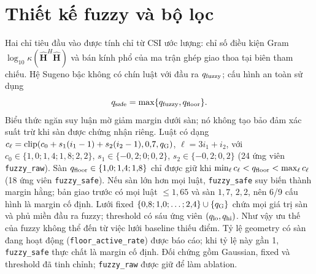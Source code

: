 \documentclass[conference,onecolumn,10pt]{IEEEtran}
\begin{document}
\section{Thiết kế fuzzy và bộ lọc}
Hai chỉ tiêu đầu vào được tính chỉ từ CSI ước lượng: chỉ số điều kiện Gram $\log_{10}\kappa(\widehat{\mathbf H}^H\widehat{\mathbf H})$ và bán kính phổ của ma trận ghép giao thoa tại biên tham chiếu. Hệ Sugeno bậc không có chín luật với đầu ra $q_{\rm fuzzy}$; cấu hình an toàn sử dụng
\begin{equation}
q_{\rm safe}=\max\{q_{\rm fuzzy},q_{\rm floor}\}.
\end{equation}
Biểu thức ngăn suy luận mờ giảm margin dưới sàn; nó không tạo bảo đảm xác suất trừ khi sàn được chứng nhận riêng. Luật có dạng $c_\ell=\mathrm{clip}(c_0+s_1(i_1-1)+s_2(i_2-1),0{,}7,q_{\rm G})$, $\ell=3i_1+i_2$, với $c_0\in\{1{,}0;1{,}4;1{,}8;2{,}2\}$, $s_1\in\{-0{,}2;0;0{,}2\}$, $s_2\in\{-0{,}2;0{,}2\}$ (24 ứng viên \texttt{fuzzy\_raw}). Sàn $q_{\rm floor}\in\{1{,}0;1{,}4;1{,}8\}$ chỉ được giữ khi $\min_\ell c_\ell<q_{\rm floor}<\max_\ell c_\ell$ (18 ứng viên \texttt{fuzzy\_safe}). Nếu sàn lớn hơn mọi luật, \texttt{fuzzy\_safe} suy biến thành margin hằng; bản giao trước có mọi luật $\leq1{,}65$ và sàn $1{,}7$, $2{,}2$, nên 6/9 cấu hình là margin cố định. Lưới fixed $\{0{,}8;1{,}0;\dots;2{,}4\}\cup\{q_{\rm G}\}$ chứa mọi giá trị sàn và phủ miền đầu ra fuzzy; threshold có sáu ứng viên $(q_{\rm lo},q_{\rm hi})$. Như vậy ưu thế của fuzzy không thể đến từ việc lưới baseline thiếu điểm. Tỷ lệ geometry có sàn đang hoạt động (\texttt{floor\_active\_rate}) được báo cáo; khi tỷ lệ này gần 1, \texttt{fuzzy\_safe} thực chất là margin cố định. Đối chứng gồm Gaussian, fixed và threshold đã tinh chỉnh; \texttt{fuzzy\_raw} được giữ để làm ablation.
\end{document}
